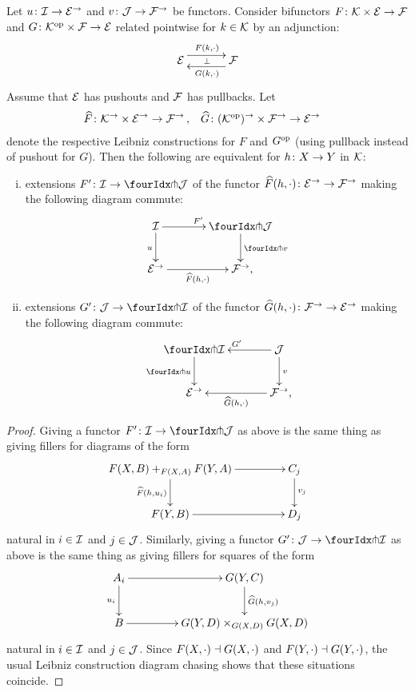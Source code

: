 \documentclass[reqno,10pt,a4paper,oneside,draft]{amsart}
\begin{document}
\begin{proposition} \label{lift-of-leibniz-adjunction}
Let $u \co \cal{I} \to \cal{E}^\to$ and $v \co \cal{J} \to \cal{F}^\to$ be functors.
Consider bifunctors $F \co \cal{K} \times \cal{E} \to \cal{F}$ and $G \co \cal{K}^{\op} \times \cal{F} \to \cal{E}$ related pointwise for
$k \in \cal{K}$ by an adjunction:
\[
\xymatrix@C+1em{
  \cal{E}
  \ar@<5pt>[r]^{F(k, \arghole)}
  \ar@{}[r]|{\bot}
&
  \cal{F}
  \ar@<5pt>[l]^{G(k, \arghole)}
}
\]
Assume that $\cal{E}$ has pushouts and $\cal{F}$ has pullbacks.
Let
\[
\begin{aligned}
  \widehat{F} &\co \cal{K}^\to \times \cal{E}^\to \to \cal{F}^\to
\, ,&
  \widehat{G} &\co (\cal{K}^{\op})^\to \times \cal{F}^\to \to \cal{E}^\to
\end{aligned}
\]
denote the respective Leibniz constructions for $F$ and $G^{\op}$ (using pullback instead of pushout for $G$).
Then the following are equivalent for $h \co X \to Y$ in $\cal{K}$:
\begin{enumerate}[(i)]
\item extensions $F' \co \cal{I} \to \liftl{\cal{J}}$ of the functor $\widehat{F}(h, \arghole) \co \cal{E}^\to \to \cal{F}^\to$ making the following diagram commute:
\[
\xymatrix@C=1.2cm{
  \cal{I}
  \ar[r]^{F'}
  \ar[d]_{u}
&
  \liftl{\cal{J}}
  \ar[d]^{\liftl{v}}
\\
  \cal{E}^\to
  \ar[r]_-{\widehat{F}(h, \arghole)}
&
  \cal{F}^\to
\rlap{,}}
\]
\item extensions $G' \co \cal{J} \to \liftr{\cal{I}}$ of the functor $\widehat{G}(h, \arghole) \co \cal{F}^\to \to \cal{E}^\to$ making the following diagram commute:
\[
\xymatrix@C=1.2cm{
  \liftr{\cal{I}}
  \ar[d]_{\liftr{u}}
&
  \cal{J}
  \ar[l]_{G'}
  \ar[d]^{v}
\\
  \cal{E}^\to
&
  \cal{F}^\to
  \ar[l]^-{\widehat{G}(h, \arghole)}
\rlap{,}}
\]
\end{enumerate}
\end{proposition}

\begin{proof}
Giving a functor $F' \co \cal{I} \to \liftl{\cal{J}}$ as above is the same thing as giving fillers for diagrams of the form
\[
\xymatrix@C+2em{
  F(X,B) +_{F(X,A)} F(Y,A)
  \ar[d]_{\widehat{F}(h, u_i)}
  \ar[r]
&
  C_j
  \ar[d]^{v_j}
\\
  F(Y, B)
  \ar[r]
&
  D_j
}
\]
natural in $i \in \cal{I}$ and $j \in \cal{J}$.
Similarly, giving a functor $G' \co \cal{J} \to \liftl{\cal{I}}$ as above is the same thing as giving fillers for squares of the form
\[
\xymatrix@C+2em{
  A_i
  \ar[d]_{u_i}
  \ar[r]
&
  G(Y, C)
  \ar[d]^{\widehat{G}(h, v_j)}
\\
  B
  \ar[r]
&
  G(Y,D) \times_{G(X,D)} G(X,D)
}
\]
natural in $i \in \cal{I}$ and $j \in \cal{J}$.
Since $F(X, \arghole) \dashv G(X, \arghole)$ and $F(Y, \arghole) \dashv G(Y, \arghole)$, the usual Leibniz construction diagram chasing shows that these situations coincide.
\end{proof}
\end{document}
